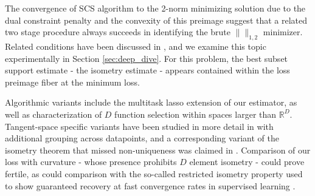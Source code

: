 The convergence of SCS algorithm to the 2-norm minimizing solution due to the dual constraint penalty and the convexity of this preimage suggest that a related two stage procedure always succeeds in identifying the brute $\|\|_{1,2}$ minimizer.
Related conditions have been discussed in \cite{Donoho2006ForML, Mishkin2022TheSP}, and we examine this topic experimentally in Section \ref{sec:deep_dive}.
For this problem, the best subset support estimate - the isometry estimate - appears contained within the loss preimage fiber at the minimum loss.

Algorithmic variants include the multitask lasso \cite{ Hastie2015-qa} extension of our estimator, as well as characterization of $D$ function selection within spaces larger than $\mathbb R^D$.
Tangent-space specific variants have been studied in more detail in \cite{Koelle2022-ju, Koelle2024-no} with additional grouping across datapoints, and a corresponding variant of the isometry theorem that missed non-uniqueness was claimed in \cite{Koelle2022-lp}.
Comparison of our loss with curvature - whose presence prohibits $D$ element isometry - could prove fertile, as could comparison with the so-called restricted isometry property used to show guaranteed recovery at fast convergence rates in supervised learning \cite{Candes2005-dd, Hastie2015-qa}.